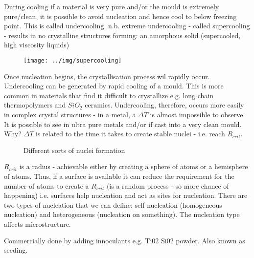 During cooling if a material is very pure and/or the mould is extremely pure/clean, it is possible to avoid nucleation and hence cool to below freezing point. This is called undercooling. n.b. extreme undercooling - called supercooling - results in no crystalline structures forming: an amorphous solid (supercooled, high viscosity liquids)
\begin{figure}[h]
  \centering
  \texttt{[image: ../img/supercooling]}
\end{figure}
Once nucleation begins, the crystallisation process wil rapidly occur. Undercooling can be generated by rapid cooling of a mould. This is more common in materials that find it difficult to crystallize e.g. long chain thermopolymers and $SiO_2$ ceramics. Undercooling, therefore, occurs more easily in complex crystal structures - in a metal, a $\Delta T$ is almost impossible to observe. It is possible to see in ultra pure metals and/or if cast into a very clean mould. Why? $\Delta T$ is related to the time it takes to create stable nuclei - i.e. reach $R_{crit}$.
\begin{figure}[h]
  \centering
  \hfill
  \caption{Different sorts of nuclei formation}
\end{figure}
$R_{crit}$ is a radius - achievable either by creating a sphere of atoms or a hemisphere of atoms. Thus, if a surface is available it can reduce the requirement for the number of atoms to create a $R_{crit}$ (is a random process - so more chance of happening) i.e. surfaces help nucleation and act as sites for nucleation. There are two types of nucleation that we can define: self nucleation (homogeneous nucleation) and heterogeneous (nucleation on something). The nucleation type affects microstructure.
\begin{figure}[h]
  \centering
  \hfill
\end{figure}
Commercially done by adding innoculants e.g. Ti02 Si02 powder. Also known as seeding.


